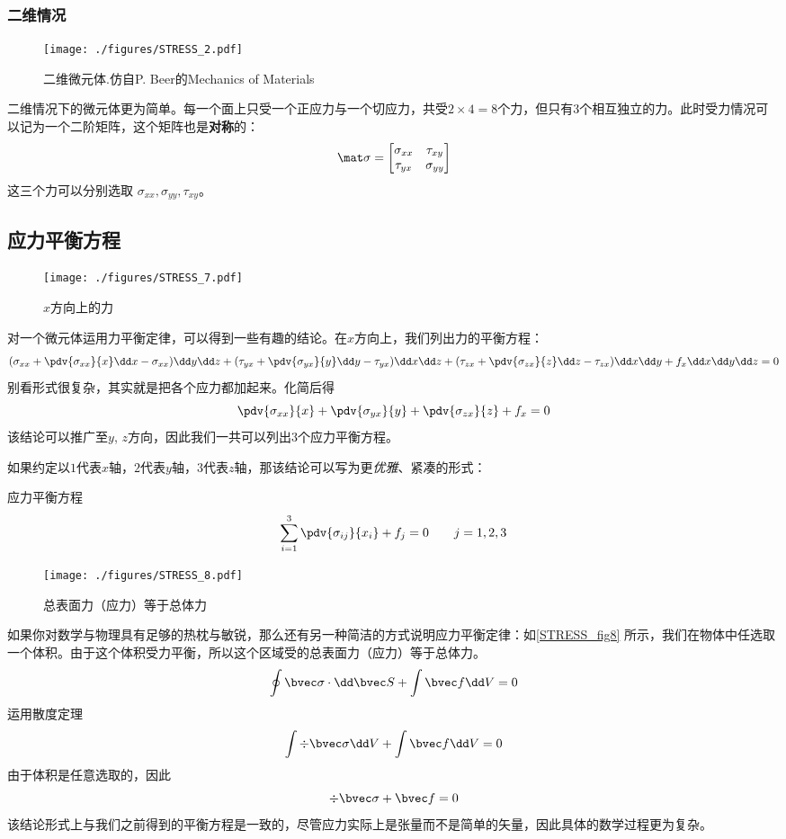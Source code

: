 \subsubsection{二维情况}
\begin{figure}[ht]
\centering
\texttt{[image: ./figures/STRESS\_2.pdf]}
\caption{二维微元体.仿自P. Beer的Mechanics of Materials} \label{STRESS_fig2}
\end{figure}

二维情况下的微元体更为简单。每一个面上只受一个正应力与一个切应力，共受$2\times4=8$个力，但只有$3$个相互独立的力。此时受力情况可以记为一个二阶矩阵，这个矩阵也是\textbf{对称}的：
\begin{equation}
\mat \sigma=
\begin{bmatrix}
\sigma_{xx} & \tau_{xy}\\
\tau_{yx} & \sigma_{yy}\\
\end{bmatrix}
\end{equation}
这三个力可以分别选取 $\sigma_{xx}, \sigma_{yy}, \tau_{xy}$。

\subsection{应力平衡方程}
\begin{figure}[ht]
\centering
\texttt{[image: ./figures/STRESS\_7.pdf]}
\caption{$x$方向上的力} \label{STRESS_fig7}
\end{figure}
对一个微元体运用力平衡定律，可以得到一些有趣的结论。在$x$方向上，我们列出力的平衡方程：
$$
(\sigma_{xx} + \pdv{\sigma_{xx}}{x} \dd x - \sigma_{xx})\dd y \dd z
+ (\tau_{yx} + \pdv{\sigma_{yx}}{y} \dd y - \tau_{yx}) \dd x \dd z
+ (\tau_{zx} + \pdv{\sigma_{zx}}{z} \dd z - \tau_{zx}) \dd x \dd y 
+ f_x \dd x \dd y \dd z= 0$$
别看形式很复杂，其实就是把各个应力都加起来。化简后得
$$
\pdv{\sigma_{xx}}{x} + \pdv{\sigma_{yx}}{y} + \pdv{\sigma_{zx}}{z} + f_x = 0
$$
该结论可以推广至$y$, $z$方向，因此我们一共可以列出$3$个应力平衡方程。

如果约定以$1$代表$x$轴，$2$代表$y$轴，$3$代表$z$轴，那该结论可以写为更\textsl{优雅}、紧凑的形式：
\begin{theorem}{应力平衡方程}
$$
\sum_{i=1}^3 \pdv{\sigma_{ij}}{x_i} + f_j=0 \qquad j=1,2,3
$$
\end{theorem}

\begin{figure}[ht]
\centering
\texttt{[image: ./figures/STRESS\_8.pdf]}
\caption{总表面力（应力）等于总体力} \label{STRESS_fig8}
\end{figure}
如果你对数学与物理具有足够的热枕与敏锐，那么还有另一种简洁的方式说明应力平衡定律：如\autoref{STRESS_fig8} 所示，我们在物体中任选取一个体积。由于这个体积受力平衡，所以这个区域受的总表面力（应力）等于总体力。
$$\oint \bvec \sigma \cdot \dd \bvec S + \int \bvec f \dd V = 0$$
运用散度定理
$$\int \div \bvec \sigma \dd V + \int \bvec f \dd V = 0$$
由于体积是任意选取的，因此
$$\div \bvec \sigma + \bvec f = 0$$
该结论形式上与我们之前得到的平衡方程是一致的，尽管应力实际上是张量而不是简单的矢量，因此具体的数学过程更为复杂。

